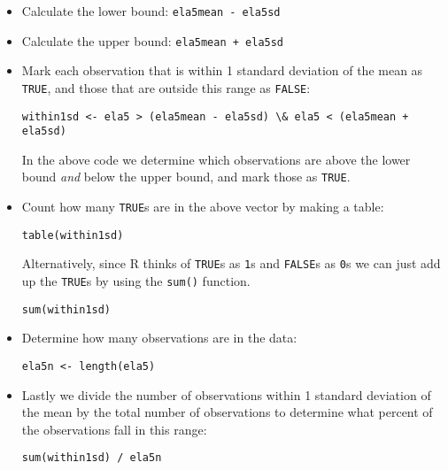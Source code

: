 \documentclass[11pt]{article}
\begin{document}
{\small
\begin{itemize}

\item Calculate the lower bound: \texttt{ela5mean - ela5sd}

\item Calculate the upper bound: \texttt{ela5mean + ela5sd}

\item Mark each observation that is within 1 standard deviation of the mean as \texttt{TRUE}, and those that are outside this range as \texttt{FALSE}:

\begin{lstlisting}
within1sd <- ela5 > (ela5mean - ela5sd) \& ela5 < (ela5mean + ela5sd)
\end{lstlisting}

In the above code we determine which observations are above the lower bound \textit{and} below the upper bound, and mark those as \texttt{TRUE}. 

\item Count how many \texttt{TRUE}s are in the above vector by making a table:

\begin{lstlisting}
table(within1sd)
\end{lstlisting}

Alternatively, since R thinks of \texttt{TRUE}s as \texttt{1}s and \texttt{FALSE}s as \texttt{0}s we can just add up the \texttt{TRUE}s by using the \texttt{sum()} function.

\begin{lstlisting}
sum(within1sd)
\end{lstlisting}

\item Determine how many observations are in the data:

\begin{lstlisting}
ela5n <- length(ela5)
\end{lstlisting}

\item Lastly we divide the number of observations within 1 standard deviation of the mean by the total number of observations to determine what percent of the observations fall in this range:

\begin{lstlisting}
sum(within1sd) / ela5n
\end{lstlisting}

\end{itemize}
}
\end{document}
